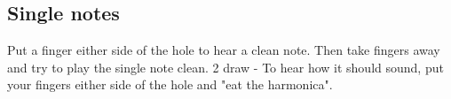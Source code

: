 \subsection{Single notes}
    Put a finger either side of the hole to hear a clean note.
    Then take fingers away and try to play the single note clean.
    2 draw - To hear how it should sound, put your fingers either side of the hole and "eat the harmonica".